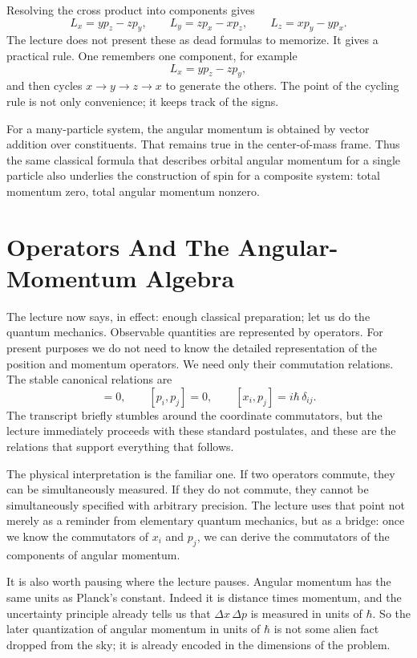Resolving the cross product into components gives
\begin{equation}
L_x=yp_z-zp_y,\qquad
L_y=zp_x-xp_z,\qquad
L_z=xp_y-yp_x.
\end{equation}
The lecture does not present these as dead formulas to memorize. It gives a practical rule. One remembers one component, for example
\[
L_x=yp_z-zp_y,
\]
and then cycles \(x\to y\to z\to x\) to generate the others. The point of the cycling rule is not only convenience; it keeps track of the signs.

For a many-particle system, the angular momentum is obtained by vector addition over constituents. That remains true in the center-of-mass frame. Thus the same classical formula that describes orbital angular momentum for a single particle also underlies the construction of spin for a composite system: total momentum zero, total angular momentum nonzero.

\section{Operators And The Angular-Momentum Algebra}

The lecture now says, in effect: enough classical preparation; let us do the quantum mechanics. Observable quantities are represented by operators. For present purposes we do not need to know the detailed representation of the position and momentum operators. We need only their commutation relations. The stable canonical relations are
\begin{equation}
[x_i,x_j]=0,\qquad [p_i,p_j]=0,\qquad [x_i,p_j]=i\hbar\,\delta_{ij}.
\end{equation}
The transcript briefly stumbles around the coordinate commutators, but the lecture immediately proceeds with these standard postulates, and these are the relations that support everything that follows.

The physical interpretation is the familiar one. If two operators commute, they can be simultaneously measured. If they do not commute, they cannot be simultaneously specified with arbitrary precision. The lecture uses that point not merely as a reminder from elementary quantum mechanics, but as a bridge: once we know the commutators of \(x_i\) and \(p_j\), we can derive the commutators of the components of angular momentum.

It is also worth pausing where the lecture pauses. Angular momentum has the same units as Planck's constant. Indeed it is distance times momentum, and the uncertainty principle already tells us that \(\Delta x\,\Delta p\) is measured in units of \(\hbar\). So the later quantization of angular momentum in units of \(\hbar\) is not some alien fact dropped from the sky; it is already encoded in the dimensions of the problem.

